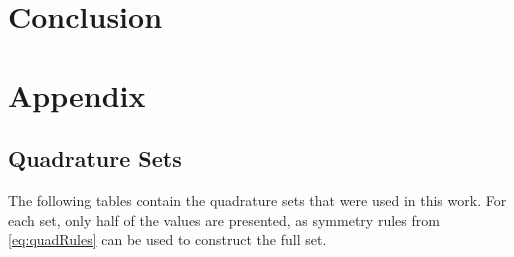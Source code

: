 \documentclass{article}
\begin{document}
\section{Conclusion} 




\section{Appendix}

\subsection{Quadrature Sets} \label{sec:qsets}
The following tables contain the quadrature sets that were used in this work.
For each set, only half of the values are presented, as symmetry rules from \cref{eq:quadRules}
can be used to construct the full set.



\end{document}
